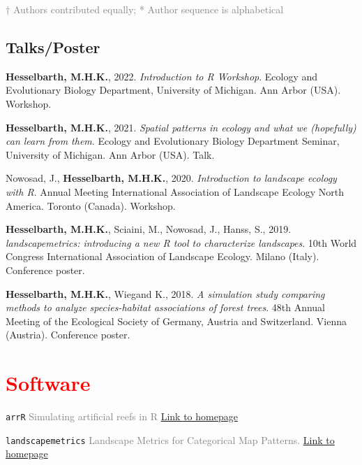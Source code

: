 \documentclass[10pt, hidelinks]{report}
\begin{document}
\textcolor{grey}{\footnotesize{† Authors contributed equally; * Author sequence is alphabetical}}

\subsection*{Talks/Poster}

\begin{hangparas}{.25in}{1}

\textbf{Hesselbarth, M.H.K.}, 2022. \textit{Introduction to R Workshop}. Ecology and Evolutionary Biology Department, University of Michigan. Ann Arbor (USA). Workshop.

\textbf{Hesselbarth, M.H.K.}, 2021. \textit{Spatial patterns in ecology and what we (hopefully) can learn from them}. Ecology and Evolutionary Biology Department Seminar, University of Michigan. Ann Arbor (USA). Talk.

Nowosad, J., \textbf{Hesselbarth, M.H.K.}, 2020. \textit{Introduction to landscape ecology with R}. Annual Meeting International Association of Landscape Ecology North America. Toronto (Canada). Workshop.

\textbf{Hesselbarth, M.H.K.}, Sciaini, M., Nowosad, J., Hanss, S., 2019. \textit{landscapemetrics: introducing a new R tool to characterize landscapes}. 10th World Congress International Association of Landscape Ecology. Milano (Italy). Conference poster.

\textbf{Hesselbarth, M.H.K.}, Wiegand K., 2018. \textit{A simulation study comparing methods to analyze species-habitat associations of forest trees}. 48th Annual Meeting of the Ecological Society of Germany, Austria and Switzerland. Vienna (Austria). Conference poster.

\end{hangparas}


\section*{\textcolor{red}{Software} \sout{\hfill}}

\texttt{arrR} \textcolor{grey}{Simulating artificial reefs in R}
\hfill
\textcolor{blue}{\href{https://allgeier-lab.github.io/arrR/}{Link to homepage}}

\texttt{landscapemetrics} \textcolor{grey}{Landscape Metrics for Categorical Map Patterns.}
\hfill
\textcolor{blue}{\href{https://r-spatialecology.github.io/landscapemetrics/}{Link to homepage}}
\end{document}
